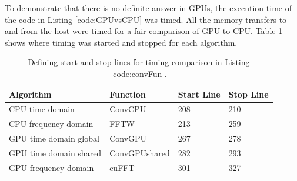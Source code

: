 To demonstrate that there is no definite answer in GPUs, 
the execution time of the code in Listing \ref{code:GPUvsCPU} was timed.
All the memory transfers to and from the host were timed for a fair comparison of GPU to CPU.
Table \ref{tab:CPUvsGPUtimingTable} shows where timing was started and stopped for each algorithm.
\begin{table}
\caption{Defining start and stop lines for timing comparison in Listing \ref{code:convFun}.}
\begin{center}
\begin{tabular}{llll}
	\toprule
	Algorithm 				& Function		& Start Line	& Stop  Line		\\ \midrule
	CPU time domain 		& ConvCPU 		& 208			& 210 				\\
	CPU frequency domain 	& FFTW 			& 213			& 259 				\\
	GPU time domain global 	& ConvGPU 		& 267			& 278				\\
	GPU time domain shared 	& ConvGPUshared & 282			& 293				\\
	GPU frequency domain 	& cuFFT			& 301			& 327				\\ 
	\bottomrule
\end{tabular}
\end{center}
\label{tab:CPUvsGPUtimingTable}
\end{table}

